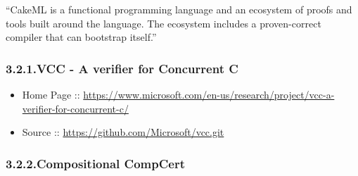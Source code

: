 \documentclass[12pt,twoside]{article}
\begin{document}
\noindent{}\textquotedblleft{}CakeML is a functional programming language and an ecosystem of proofs
and tools built around the language. The ecosystem includes a
proven-correct compiler that can bootstrap itself.\textquotedblright{}%

\subsubsection{3.2.1.\hspace*{0.5em}VCC - A verifier for Concurrent C}\label{sec-vcc---a-verifier-for-concurrent-c}%

\begin{itemize}[noitemsep,topsep=\mdcompacttopsep]%

\item{}Home Page :: \href{https://www.microsoft.com/en-us/research/project/vcc-a-verifier-for-concurrent-c/}{{\ttfamily https://\hspace{0pt}www.\hspace{0pt}microsoft.\hspace{0pt}com/\hspace{0pt}en-\hspace{0pt}us/\hspace{0pt}research/\hspace{0pt}project/\hspace{0pt}vcc-\hspace{0pt}a-\hspace{0pt}verifier-\hspace{0pt}for-\hspace{0pt}concurrent-\hspace{0pt}c/\hspace{0pt}}}%

\item{}Source :: \href{https://github.com/Microsoft/vcc.git}{{\ttfamily https://\hspace{0pt}github.\hspace{0pt}com/\hspace{0pt}Microsoft/\hspace{0pt}vcc.\hspace{0pt}git}}%
\end{itemize}%

\subsubsection{3.2.2.\hspace*{0.5em}Compositional CompCert}\label{sec-compositional-compcert}%
\end{document}

